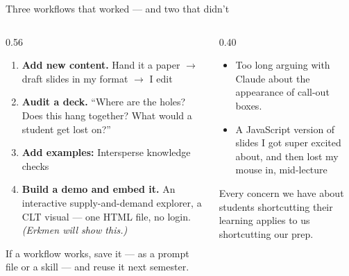 \documentclass[aspectratio=169, 10pt]{beamer}
\begin{document}
\begin{frame}{Three workflows that worked --- and two that didn't}
\vskip2pt
\begin{columns}[T]
\begin{column}{0.56\textwidth}
\begin{tcolorbox}[keybox, title={\faCheck\quad Worked}]
\small
\begin{enumerate}\setlength{\itemsep}{3pt}
  \item \textbf{Add new content.} Hand it a paper $\rightarrow$ draft slides in my format $\rightarrow$ I edit
  \item \textbf{Audit a deck.} ``Where are the holes? Does this hang together? What would a student get lost on?''
  \item \textbf{Add examples:} Intersperse knowledge checks
  \item \textbf{Build a demo and embed it.} An interactive supply-and-demand explorer, a CLT visual --- one HTML file, no login. \emph{(Erkmen will show this.)}
\end{enumerate}
\vskip3pt
{\footnotesize\color{CoolGray} If a workflow works, save it --- as a prompt file or a skill --- and reuse it next semester.}
\end{tcolorbox}
\end{column}
\begin{column}{0.40\textwidth}
\begin{tcolorbox}[dontbox, title={\faTimes\quad Didn't}]
\small
\begin{itemize}\setlength{\itemsep}{3pt}
  \item Too long arguing with Claude about the appearance of call-out boxes. 
  \item A JavaScript version of slides I got super excited about, and then lost my mouse in, mid-lecture
\end{itemize}
\end{tcolorbox}
\vskip4pt
\begin{tcolorbox}[accentbox, top=2pt, bottom=2pt]
\footnotesize Every concern we have about students shortcutting their learning applies to us shortcutting our prep.
\end{tcolorbox}
\end{column}
\end{columns}
\end{frame}
\end{document}

